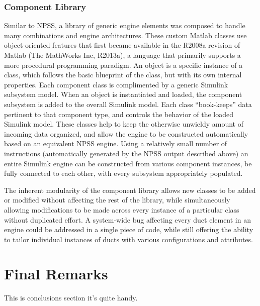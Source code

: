 \documentclass[heading.tex]{subfiles}
\begin{document}
\subsubsection{Component Library}

Similar to NPSS, a library of generic engine elements was composed to handle many combinations and
engine architectures. These custom Matlab classes use object-oriented features that first became
available in the R2008a revision of Matlab (The MathWorks Inc, R2013a), a language that primarily
supports a more procedural programming paradigm. An object is a specific instance of a class,
which follows the basic blueprint of the class, but with its own internal properties. Each
component class is complimented by a generic Simulink subsystem model. When an object is
instantiated and loaded, the component subsystem is added to the overall Simulink model. Each
class “book-keeps” data pertinent to that component type, and controls the behavior of the loaded
Simulink model. These classes help to keep the otherwise unwieldy amount of incoming data
organized, and allow the engine to be constructed automatically based on an equivalent NPSS
engine. Using a relatively small number of instructions (automatically generated by the NPSS
output described above) an entire Simulink engine can be constructed from various component
instances, be fully connected to each other, with every subsystem appropriately populated.

	The inherent modularity of the component library allows new classes to be added or modified
without affecting the rest of the library, while simultaneously allowing modifications to be made
across every instance of a particular class without duplicated effort. A system-wide bug affecting
every duct element in an engine could be addressed in a single piece of code, while still offering
the ability to tailor individual instances of ducts with various configurations and attributes.

\section{Final Remarks}
This is conclusions section it's quite handy.
\end{document}
